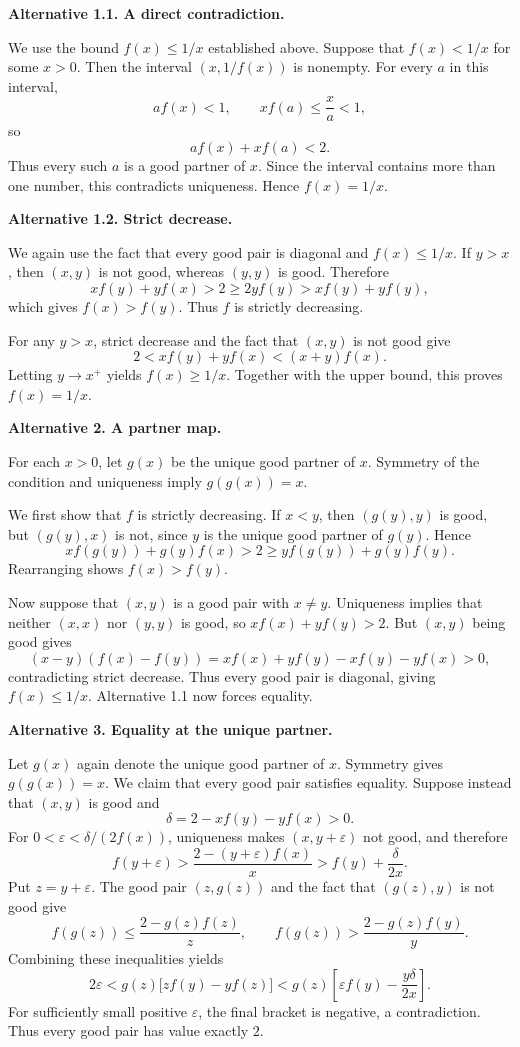 \begin{dlsummary}[title={\bfseries Solution 17. IMO 2022 Shortlist -- Algebra A3},breakable]
\medskip
\noindent
\textbf{Alternative 1.1. A direct contradiction.}

We use the bound $f(x)\leq1/x$ established above. Suppose that
$f(x)<1/x$ for some $x>0$. Then the interval $(x,1/f(x))$ is nonempty.
For every $a$ in this interval,
\[
af(x)<1,\qquad xf(a)\leq\frac{x}{a}<1,
\]
so
\[
af(x)+xf(a)<2.
\]
Thus every such $a$ is a good partner of $x$. Since the interval contains
more than one number, this contradicts uniqueness. Hence $f(x)=1/x$.

\medskip
\noindent
\textbf{Alternative 1.2. Strict decrease.}

We again use the fact that every good pair is diagonal and
$f(x)\leq1/x$. If $y>x$, then $(x,y)$ is not good, whereas $(y,y)$ is
good. Therefore
\[
xf(y)+yf(x)>2\geq2yf(y)>xf(y)+yf(y),
\]
which gives $f(x)>f(y)$. Thus $f$ is strictly decreasing.

For any $y>x$, strict decrease and the fact that $(x,y)$ is not good give
\[
2<xf(y)+yf(x)<(x+y)f(x).
\]
Letting $y\to x^+$ yields $f(x)\geq1/x$. Together with the upper bound,
this proves $f(x)=1/x$.

\medskip
\noindent
\textbf{Alternative 2. A partner map.}

For each $x>0$, let $g(x)$ be the unique good partner of $x$. Symmetry of
the condition and uniqueness imply $g(g(x))=x$.

We first show that $f$ is strictly decreasing. If $x<y$, then
$(g(y),y)$ is good, but $(g(y),x)$ is not, since $y$ is the unique good
partner of $g(y)$. Hence
\[
xf(g(y))+g(y)f(x)>2\geq yf(g(y))+g(y)f(y).
\]
Rearranging shows $f(x)>f(y)$.

Now suppose that $(x,y)$ is a good pair with $x\ne y$. Uniqueness
implies that neither $(x,x)$ nor $(y,y)$ is good, so
$xf(x)+yf(y)>2$. But $(x,y)$ being good gives
\[
(x-y)(f(x)-f(y))
=xf(x)+yf(y)-xf(y)-yf(x)>0,
\]
contradicting strict decrease. Thus every good pair is diagonal, giving
$f(x)\leq1/x$. Alternative 1.1 now forces equality.

\medskip
\noindent
\textbf{Alternative 3. Equality at the unique partner.}

Let $g(x)$ again denote the unique good partner of $x$. Symmetry gives
$g(g(x))=x$. We claim that every good pair satisfies equality. Suppose
instead that $(x,y)$ is good and
\[
\delta=2-xf(y)-yf(x)>0.
\]
For $0<\varepsilon<\delta/(2f(x))$, uniqueness makes $(x,y+\varepsilon)$
not good, and therefore
\[
f(y+\varepsilon)
>\frac{2-(y+\varepsilon)f(x)}{x}
>f(y)+\frac{\delta}{2x}.
\]
Put $z=y+\varepsilon$. The good pair $(z,g(z))$ and the fact that
$(g(z),y)$ is not good give
\[
f(g(z))\leq\frac{2-g(z)f(z)}{z},
\qquad
f(g(z))>\frac{2-g(z)f(y)}{y}.
\]
Combining these inequalities yields
\[
2\varepsilon<g(z)\bigl[zf(y)-yf(z)\bigr]
<g(z)\left[\varepsilon f(y)-\frac{y\delta}{2x}\right].
\]
For sufficiently small positive $\varepsilon$, the final bracket is
negative, a contradiction. Thus every good pair has value exactly $2$.


\end{dlsummary}
